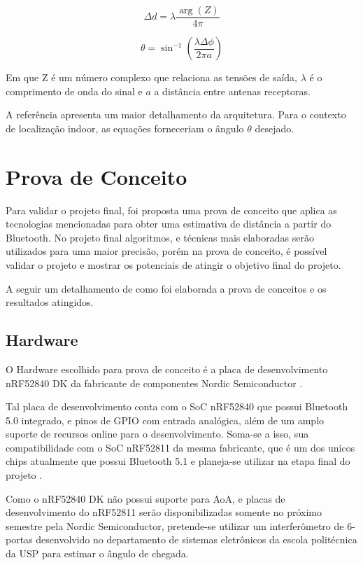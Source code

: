 \begin{equation}
    \Delta d = \lambda \frac{\arg\left ({Z}  \right ) }{4\pi }
    \end{equation}

\begin{equation} \label{eq:eq_AoA}
    \theta = \sin^{-1}{(\frac{\lambda \Delta \phi}{2\pi a} )}
    \end{equation}

Em que Z é um número complexo que relaciona as tensões de saída, \(\lambda\) é o comprimento de onda do sinal e \(a\) a distância entre antenas receptoras.

A referência \cite{art15} apresenta um maior detalhamento da arquitetura. Para o contexto de localização indoor, as equações forneceriam o ângulo \(\theta\) desejado.

\section{Prova de Conceito}
Para validar o projeto final, foi proposta uma prova de conceito que aplica as tecnologias mencionadas para obter uma estimativa de distância a partir do Bluetooth.
No projeto final algoritmos, e técnicas mais elaboradas serão utilizados para uma maior precisão, porém na prova de conceito, é possível validar o projeto e mostrar os potenciais de atingir o objetivo final do projeto.

A seguir um detalhamento de como foi elaborada a prova de conceitos e os resultados atingidos.

\subsection{Hardware}
O Hardware escolhido para prova de conceito é a placa de desenvolvimento nRF52840 DK da fabricante de componentes Nordic Semiconductor \cite{nRF52840_site}.

Tal placa de desenvolvimento conta com o SoC nRF52840 que possui Bluetooth 5.0 integrado, e pinos de GPIO com entrada analógica, além de um amplo suporte de recursos online para o desenvolvimento. Soma-se a isso, sua compatibilidade com o SoC nRF52811 da mesma fabricante, que é um dos unicos chips atualmente que possui Bluetooth 5.1 e planeja-se utilizar na etapa final do projeto \cite{nRF52811_site}.

Como o nRF52840 DK não possui suporte para AoA, e placas de desenvolvimento do nRF52811 serão disponibilizadas somente no próximo semestre pela Nordic Semiconductor, pretende-se utilizar um interferômetro de 6-portas desenvolvido no departamento de sistemas eletrônicos da escola politécnica da USP para estimar o ângulo de chegada.

